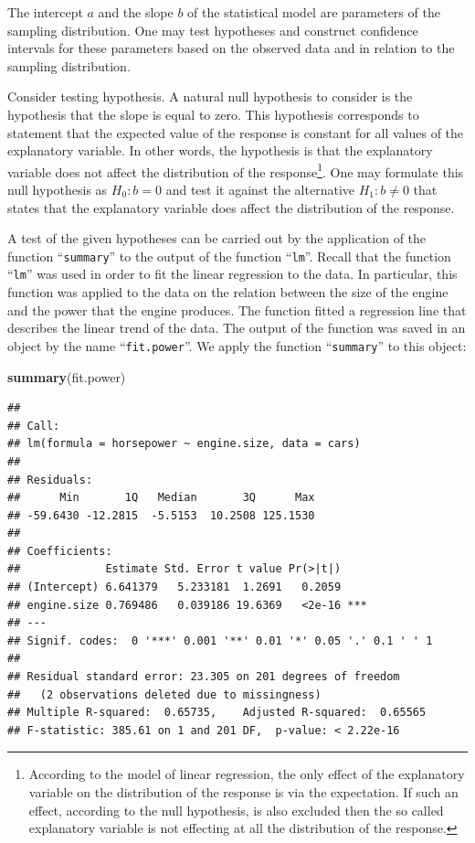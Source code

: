 \documentclass[]{krantz}
\makeatletter
\newenvironment{Shaded}{\begin{snugshade}}{\end{snugshade}}
\newcommand{\KeywordTok}[1]{\textcolor[rgb]{0.13,0.29,0.53}{\textbf{#1}}}
\newcommand{\NormalTok}[1]{#1}
\newenvironment{kframe}{%
\medskip{}
\setlength{\fboxsep}{.8em}
 \def\at@end@of@kframe{}%
 \ifinner\ifhmode%
  \def\at@end@of@kframe{\end{minipage}}%
  \begin{minipage}{\columnwidth}%
 \fi\fi%
 \def\FrameCommand##1{\hskip\@totalleftmargin \hskip-\fboxsep
 \colorbox{shadecolor}{##1}\hskip-\fboxsep
     \hskip-\linewidth \hskip-\@totalleftmargin \hskip\columnwidth}%
 \MakeFramed {\advance\hsize-\width
   \@totalleftmargin\z@ \linewidth\hsize
   \@setminipage}}%
 {\par\unskip\endMakeFramed%
 \at@end@of@kframe}
\renewenvironment{Shaded}{\begin{kframe}}{\end{kframe}}
\theoremstyle{definition}
\theoremstyle{definition}
\theoremstyle{definition}
\theoremstyle{remark}
\makeatother
\begin{document}
The intercept \(a\) and the slope \(b\) of the statistical model are
parameters of the sampling distribution. One may test hypotheses and
construct confidence intervals for these parameters based on the
observed data and in relation to the sampling distribution.

Consider testing hypothesis. A natural null hypothesis to consider is
the hypothesis that the slope is equal to zero. This hypothesis
corresponds to statement that the expected value of the response is
constant for all values of the explanatory variable. In other words, the
hypothesis is that the explanatory variable does not affect the
distribution of the response\footnote{According to the model of linear regression, the only effect of
  the explanatory variable on the distribution of the response is via
  the expectation. If such an effect, according to the null
  hypothesis, is also excluded then the so called explanatory variable
  is not effecting at all the distribution of the response.}. One may formulate this null hypothesis
as \(H_0:b = 0\) and test it against the alternative \(H_1: b \not= 0\) that
states that the explanatory variable does affect the distribution of the
response.

A test of the given hypotheses can be carried out by the application of
the function ``\texttt{summary}'' to the output of the function ``\texttt{lm}''. Recall
that the function ``\texttt{lm}'' was used in order to fit the linear regression
to the data. In particular, this function was applied to the data on the
relation between the size of the engine and the power that the engine
produces. The function fitted a regression line that describes the
linear trend of the data. The output of the function was saved in an
object by the name ``\texttt{fit.power}''. We apply the function ``\texttt{summary}'' to
this object:

\begin{Shaded}
\begin{Highlighting}[]
\KeywordTok{summary}\NormalTok{(fit.power)}
\end{Highlighting}
\end{Shaded}

\begin{verbatim}
## 
## Call:
## lm(formula = horsepower ~ engine.size, data = cars)
## 
## Residuals:
##      Min       1Q   Median       3Q      Max 
## -59.6430 -12.2815  -5.5153  10.2508 125.1530 
## 
## Coefficients:
##             Estimate Std. Error t value Pr(>|t|)    
## (Intercept) 6.641379   5.233181  1.2691   0.2059    
## engine.size 0.769486   0.039186 19.6369   <2e-16 ***
## ---
## Signif. codes:  0 '***' 0.001 '**' 0.01 '*' 0.05 '.' 0.1 ' ' 1
## 
## Residual standard error: 23.305 on 201 degrees of freedom
##   (2 observations deleted due to missingness)
## Multiple R-squared:  0.65735,    Adjusted R-squared:  0.65565 
## F-statistic: 385.61 on 1 and 201 DF,  p-value: < 2.22e-16
\end{verbatim}
\end{document}

